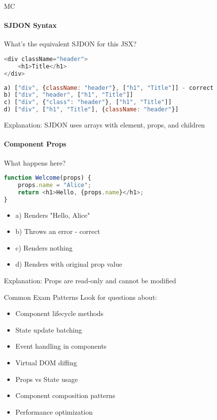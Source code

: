 \begin{KR}{MC}
\paragraph{SJDON Syntax}
What's the equivalent SJDON for this JSX?
\begin{lstlisting}[language=JavaScript, style=basesmol]
<div className="header">
    <h1>Title</h1>
</div>
\end{lstlisting}

\begin{lstlisting}[language=JavaScript, style=basesmol]
a) ["div", {className: "header"}, ["h1", "Title"]] - correct
b) ["div", "header", ["h1", "Title"]]
c) ["div", {"class": "header"}, ["h1", "Title"]]
d) ["div", ["h1", "Title"], {className: "header"}]
\end{lstlisting}
Explanation: SJDON uses arrays with element, props, and children

\paragraph{Component Props}
What happens here?
\begin{lstlisting}[language=JavaScript, style=basesmol]
function Welcome(props) {
    props.name = "Alice";
    return <h1>Hello, {props.name}</h1>;
}
\end{lstlisting}
\begin{itemize}
    \item a) Renders "Hello, Alice"
    \item b) Throws an error - correct
    \item c) Renders nothing
    \item d) Renders with original prop value
\end{itemize}
Explanation: Props are read-only and cannot be modified
\end{KR}

\begin{concept}{Common Exam Patterns}
Look for questions about:
\begin{itemize}
    \item Component lifecycle methods
    \item State update batching
    \item Event handling in components
    \item Virtual DOM diffing
    \item Props vs State usage
    \item Component composition patterns
    \item Performance optimization
\end{itemize}
\end{concept}

